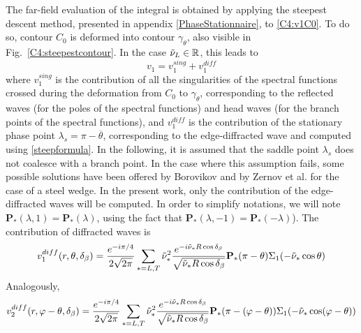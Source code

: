 The far-field evaluation of the integral is obtained by applying the steepest descent method, presented in appendix \ref{PhaseStationnaire}, to \eqref{C4:v1C0}. To do so, contour $C_0$ is deformed into contour $\gamma_{\theta}$, also visible in Fig.~\ref{C4:steepestcontour}. In the case $\tilde{\nu}_L \in \mathbb{R}$, this leads to
\begin{equation}
v_1=v_1^{sing}+v_1^{diff}
\end{equation}
where $v_1^{sing}$ is the contribution of all the singularities of the spectral functions crossed during the deformation from $C_0$ to $\gamma_{\theta}$, corresponding to the reflected waves (for the poles of the spectral functions) and head waves (for the branch points of the spectral functions), and $v_1^{diff}$ is the contribution of the stationary phase point $\lambda_s=\pi-\overline{\theta}$, corresponding to the edge-diffracted wave and computed using \eqref{steepformula}. In the following, it is assumed that the saddle point $\lambda_s$ does not coalesce with a branch point. In the case where this assumption fails, some possible solutions have been offered by Borovikov \cite{Borovikov} and by Zernov et al. \cite{Zernovcrit} for the case of a steel wedge. In the present work, only the contribution of the edge-diffracted waves will be computed. In order to simplify notations, we will note $\mathbf{P}_*(\lambda,1)=\mathbf{P}_*(\lambda)$, using the fact that $\mathbf{P}_*(\lambda,-1)=\mathbf{P}_*(-\lambda)$). The contribution of diffracted waves is 
\begin{equation}
v_1^{diff}(r,\theta,\delta_{\beta})=\frac{e^{-i\pi/4}}{2\sqrt{2\pi}}\sum_{*=L,T}\tilde{\nu}_*^2\frac{e^{-i\tilde{\nu}_*R\cos\delta_{\beta}}}{\sqrt{\tilde{\nu}_*R\cos\delta_{\beta}}}\mathbf{P_*}(\pi-\theta)\Sigma_1(-\tilde{\nu}_*\cos\theta)
\end{equation}
Analogously,
\begin{equation}
v_2^{diff}(r,\varphi-\theta,\delta_{\beta})=\frac{e^{-i\pi/4}}{2\sqrt{2\pi}}\sum_{*=L,T}\tilde{\nu}_*^2\frac{e^{-i\tilde{\nu}_*R\cos\delta_{\beta}}}{\sqrt{\tilde{\nu}_*R\cos\delta_{\beta}}}\mathbf{P_*}(\pi-(\varphi-\theta))\Sigma_1(-\tilde{\nu}_*\cos(\varphi-\theta))
\end{equation}

